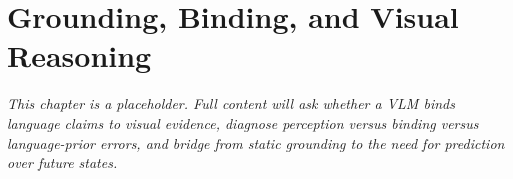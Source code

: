 \chapter{Grounding, Binding, and Visual Reasoning}
\label{ch:grounding-binding-visual-reasoning}


\textit{This chapter is a placeholder. Full content will ask whether a VLM binds language claims to visual evidence, diagnose perception versus binding versus language-prior errors, and bridge from static grounding to the need for prediction over future states.}
